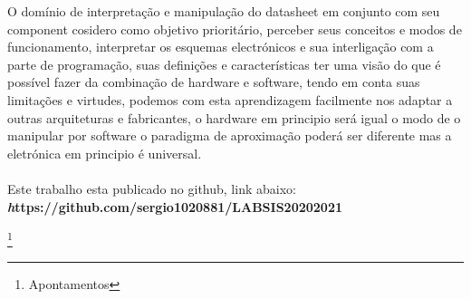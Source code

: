 \documentclass[titlepage, a4paper, 10pt, reqno, openany]{report}
\begin{document}
O dom\'{i}nio de interpreta\c{c}\~{a}o e manipula\c{c}\~{a}o do datasheet em conjunto com seu component cosidero como objetivo priorit\'{a}rio, perceber seus conceitos e modos de funcionamento, interpretar os esquemas electr\'{o}nicos e sua interliga\c{c}\~{a}o com a parte de programa\c{c}\~{a}o, suas defini\c{c}\~{o}es e caracter\'{i}sticas ter uma vis\~{a}o do que \'{e} poss\'{i}vel fazer da combina\c{c}\~{a}o de hardware e software, tendo em conta suas limita\c{c}\~{o}es e virtudes, podemos com esta aprendizagem facilmente nos adaptar a outras arquiteturas e fabricantes, o hardware em principio ser\'{a} igual o modo de o manipular por software o paradigma de aproxima\c{c}\~{a}o poder\'{a} ser diferente mas a eletr\'{o}nica em principio \'{e} universal.\\ \\
Este trabalho esta publicado no github, link abaixo: \\
{\bf \textit https://github.com/sergio1020881/LABSIS20202021}
\newpage

%
\cite{*}

%
%
\newpage
\footnote{Apontamentos}
%
	
\end{document}
